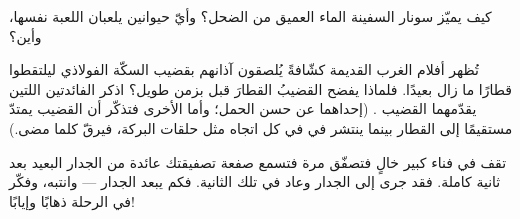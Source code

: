 \begin{exercise}[$\star$]\label{exo:g4:how-sound-travels:9}
كيف يميّز سونار السفينة الماء العميق من الضحل؟ وأيّ حيوانين
يلعبان اللعبة نفسها، وأين؟
\end{exercise}

\begin{exercise}[$\star\star$]\label{exo:g4:how-sound-travels:10}
تُظهر أفلام الغرب القديمة كشّافةً يُلصقون آذانهم بقضيب السكّة
الفولاذي ليلتقطوا قطارًا ما زال بعيدًا. فلماذا يفضح القضيبُ
القطارَ قبل  بزمن طويل؟ اذكر الفائدتين اللتين يقدّمهما
القضيب . (إحداهما عن حسن الحمل؛ وأما الأخرى فتذكّر أن
القضيب يمتدّ مستقيمًا إلى القطار بينما ينتشر  في  في
كل اتجاه مثل حلقات البركة، فيرقّ كلما مضى.)
\end{exercise}

\begin{exercise}[$\star\star$]\label{exo:g4:how-sound-travels:11}
تقف في فناء كبير خالٍ فتصفّق مرة فتسمع صفعة تصفيقتك عائدة من
الجدار البعيد بعد ثانية كاملة. فقد جرى  إلى الجدار وعاد في
تلك الثانية. فكم يبعد الجدار --- وانتبه، وفكّر في الرحلة ذهابًا
وإيابًا!
\end{exercise}
